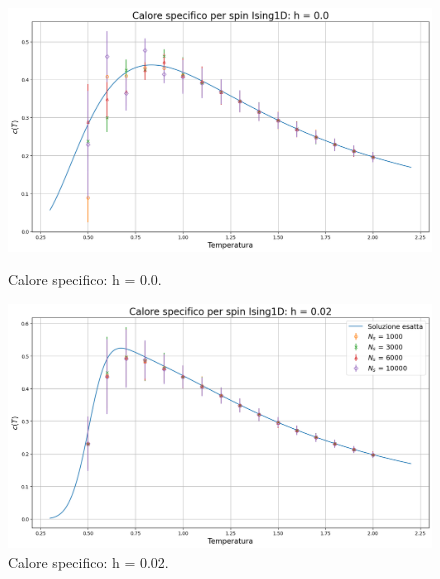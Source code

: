 \begin{figure}[htbp]
    \centering
    \begin{minipage}{0.5\textwidth}  
      \centering
      \includegraphics[page=1, width=\textwidth]{Immagini/simIsing1D/cp_h0.0.png}
      \caption{Calore specifico: h = 0.0.}
    \end{minipage}\hfill
    \begin{minipage}{0.5\textwidth}  
      \centering
      \includegraphics[page=1, width=\textwidth]{Immagini/simIsing1D/cp_h0.02.png}
      \caption{Calore specifico: h = 0.02.}
    \end{minipage}
\end{figure}
